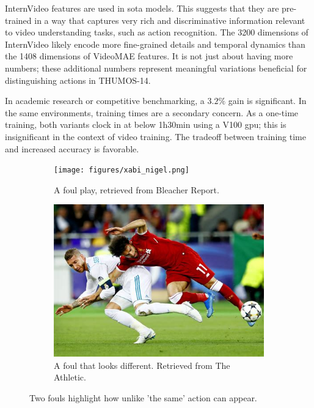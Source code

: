 InternVideo features are used in \acrshort{sota} models. This suggests that they are pre-trained in a way that captures very rich and discriminative information relevant to video understanding tasks, such as action recognition. The 3200 dimensions of InternVideo likely encode more fine-grained details and temporal dynamics than the 1408 dimensions of VideoMAE features. It is not just about having more numbers; these additional numbers represent meaningful variations beneficial for distinguishing actions in THUMOS-14.

In academic research or competitive benchmarking, a $3.2\%$ gain is significant. In the same environments, training times are a secondary concern. As a one-time training, both variants clock in at below 1h30min using a V100 \acrshort{gpu}; this is insignificant in the context of video training. The tradeoff between training time and increased accuracy is favorable. 


\begin{figure}
  \begin{subfigure}{0.42\textwidth}
    \texttt{[image: figures/xabi\_nigel.png]}
        \caption{A foul play, retrieved from Bleacher Report\cite{wyman_2018}.} 
        \label{fig:serious_foul}
  \end{subfigure}%
  \hspace*{\fill}   %
  \begin{subfigure}{0.42\textwidth}
    \includegraphics[width=\linewidth]{figures/salah_foul.png}
    \caption{A foul that looks different. Retrieved from The Athletic\cite{corrigan_2021}.} 
    \label{fig:another_foul}
  \end{subfigure}%
  \hspace*{\fill}   
  \caption{Two fouls highlight how unlike 'the same' action can appear. }
  \label{fig:different_fouls}
\end{figure}

